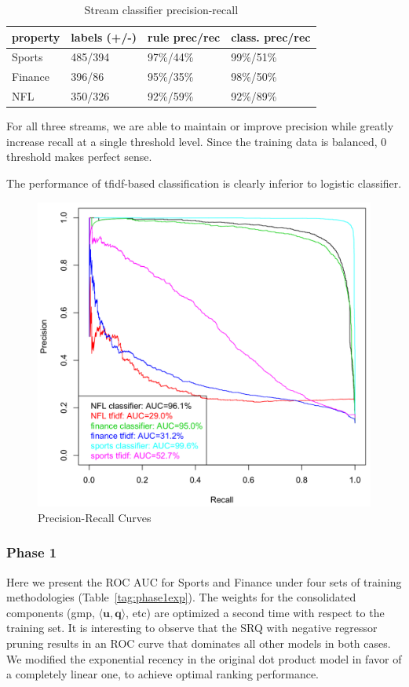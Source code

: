 \documentclass{sig-alternate}
\newcommand{\bfu}{\mathbf{u}}
\newcommand{\bfq}{\mathbf{q}}
\begin{document}
\begin{table}
\caption{Stream classifier precision-recall}
\label{tab:phase0exp}
\begin{tabular}{|l|l|l|l|}
\hline
property & labels (+/-) & rule prec/rec & class. prec/rec \\ \hline
Sports	&  485/394 & 97\%/44\% & 99\%/51\% \\ \hline
Finance & 396/86 & 95\%/35\% & 98\%/50\% \\ \hline
NFL 	& 350/326 & 92\%/59\% & 92\%/89\% \\ \hline
\end{tabular}

\end{table}


For all three streams, we are able to maintain or improve precision while 
greatly increase recall at a single threshold level. Since the training data 
is balanced, $0$ threshold makes perfect sense.

The performance of tfidf-based classification is clearly inferior to logistic 
classifier.

\begin{figure}[H]
\centering
\caption{Precision-Recall Curves} \label{precision-recall}
\includegraphics[scale=0.28]{precision-recall6.pdf}

\end{figure}


\subsubsection{Phase 1}
Here we present the ROC AUC for Sports and Finance under four sets of training 
methodologies (Table~\ref{tag:phase1exp}). The weights for the consolidated 
components (gmp, $\langle \bfu, \bfq \rangle$, etc) are optimized a second 
time with respect to the training set. It is interesting to observe that the 
SRQ with negative regressor pruning results in an ROC curve that dominates all 
other models in both cases. We modified the exponential recency in the 
original dot product model in favor of a completely linear one, to achieve 
optimal ranking performance.
\end{document}
